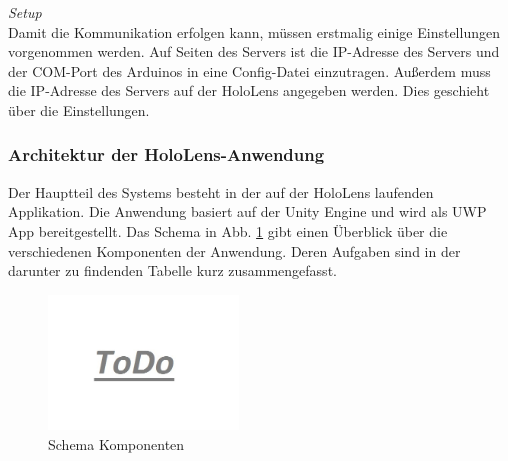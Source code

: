 \textit{Setup}\\
Damit die Kommunikation erfolgen kann, müssen erstmalig einige Einstellungen vorgenommen werden. Auf Seiten des Servers ist die IP-Adresse des Servers und der COM-Port des Arduinos in eine Config-Datei einzutragen. Außerdem muss die IP-Adresse des Servers auf der HoloLens angegeben werden. Dies geschieht über die Einstellungen.

\subsubsection{Architektur der HoloLens-Anwendung}
\label{sec-5-1-2}
Der Hauptteil des Systems besteht in der auf der HoloLens laufenden Applikation. Die Anwendung basiert auf der Unity Engine und wird als UWP App bereitgestellt. Das Schema in Abb. \ref{img:components-schema} gibt einen Überblick über die verschiedenen Komponenten der Anwendung. Deren Aufgaben sind in der darunter zu findenden Tabelle kurz zusammengefasst.

\begin{figure}[H]
	\centering
	\includegraphics[width=0.45\textwidth]{images/todo.jpg}
	\caption{Schema Komponenten}
	\label{img:components-schema}
\end{figure}


